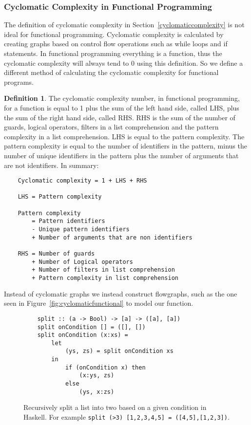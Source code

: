 \documentclass[12pt]{article}
\theoremstyle{definition}
\newtheorem*{definition}{Definition}
\theoremstyle{theorem}
\begin{document}
\subsubsection{Cyclomatic Complexity in Functional Programming}

The definition of cyclomatic complexity in Section~\ref{cyclomaticcomplexity} is
not ideal for functional programming. Cyclomatic complexity is calculated by
creating graphs based on control flow operations such as while loops and if
statements. In functional programming everything is a function, thus the
cyclomatic complexity will always tend to 0 using this definition. So we define
a different method of calculating the cyclomatic complexity for functional
programs. 

\theoremstyle{definition}
\begin{definition}
    The cyclomatic complexity number, in functional programming, for a function
    is equal to 1 plus the sum of the left hand side, called LHS, plus the sum
    of the right hand side, called RHS. RHS is the sum of the number of guards,
    logical operators, filters in a list comprehension and the pattern
    complexity in a list comprehension. LHS is equal to the pattern complexity.
    The pattern complexity is equal to the number of identifiers in the pattern,
    minus the number of unique identifiers in the pattern plus the number of
    arguments that are not identifiers. In summary:

    \begin{lstlisting}
    Cyclomatic complexity = 1 + LHS + RHS

    LHS = Pattern complexity 

    Pattern complexity   
        = Pattern identifiers 
        - Unique pattern identifiers 
        + Number of arguments that are non identifiers

    RHS = Number of guards 
        + Number of Logical operators 
        + Number of filters in list comprehension 
        + Pattern complexity in list comprehension
    \end{lstlisting}
\end{definition}

Instead of cyclomatic graphs we instead construct flowgraphs, such as the one
seen in Figure~\ref{fig:cyclomaticfunctional} to model our function.

\begin{figure}[H]
    \begin{lstlisting}
    split :: (a -> Bool) -> [a] -> ([a], [a])
    split onCondition [] = ([], [])
    split onCondition (x:xs) =
        let 
            (ys, zs) = split onCondition xs
        in 
            if (onCondition x) then 
                (x:ys, zs)
            else 
                (ys, x:zs)
    \end{lstlisting}
    \caption{Recursively split a list into two based on a given condition in
    Haskell. For example \texttt{split (>3) [1,2,3,4,5] =
    ([4,5],[1,2,3])}.}\label{fig:split}
\end{figure}
\end{document}
